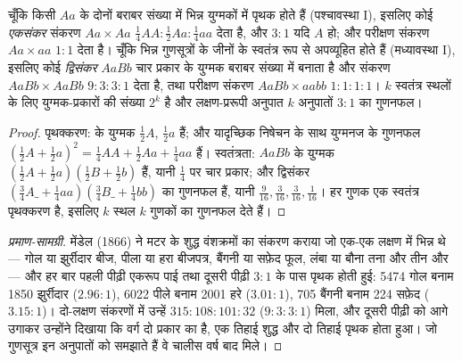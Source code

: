 \begin{theorem}[मेंडेल के अनुपात]\label{thm:b2:meiosis-heredity:mendel}
चूँकि किसी  $Aa$ के दोनों  बराबर संख्या में
भिन्न युग्मकों में पृथक होते हैं (पश्चावस्था I), इसलिए कोई
\emph{एकसंकर} संकरण $Aa \times Aa$  $\tfrac14 AA : \tfrac12 Aa :
\tfrac14 aa$ देता है, और  $3 : 1$ यदि $A$  हो; और
परीक्षण संकरण $Aa \times aa$ $1 : 1$ देता है। चूँकि भिन्न गुणसूत्रों के
जीनों के  स्वतंत्र रूप से अपव्यूहित होते हैं (मध्यावस्था I),
इसलिए कोई \emph{द्विसंकर} $AaBb$ चार प्रकार के युग्मक बराबर संख्या में
बनाता है और संकरण $AaBb \times AaBb$  $9 : 3 : 3 : 1$ देता
है, तथा परीक्षण संकरण $AaBb \times aabb$ $1 : 1 : 1 : 1$। $k$ स्वतंत्र
 स्थलों के लिए युग्मक-प्रकारों की संख्या $2^k$ है और
लक्षण-प्ररूपी अनुपात $k$ अनुपातों $3 : 1$ का गुणनफल।
\end{theorem}
\begin{proof}
पृथक्करण:  के युग्मक $\tfrac12 A$,
$\tfrac12 a$ हैं; और यादृच्छिक निषेचन के साथ युग्मनज के 
गुणनफल $(\tfrac12 A + \tfrac12 a)^2 = \tfrac14 AA + \tfrac12 Aa +
\tfrac14 aa$ हैं। स्वतंत्रता: $AaBb$ के युग्मक $(\tfrac12 A
+ \tfrac12 a)(\tfrac12 B + \tfrac12 b)$ हैं, यानी $\tfrac14$ पर चार
प्रकार; और द्विसंकर  $(\tfrac34 A\_ + \tfrac14 aa)
(\tfrac34 B\_ + \tfrac14 bb)$ का गुणनफल हैं, यानी $\tfrac{9}{16}, \tfrac{3}{16},
\tfrac{3}{16}, \tfrac{1}{16}$। हर गुणक एक स्वतंत्र पृथक्करण है,
इसलिए $k$ स्थल $k$ गुणकों का गुणनफल देते हैं।
\end{proof}
\begin{proof}[प्रमाण-सामग्री]
मेंडेल (1866) ने मटर के शुद्ध वंशक्रमों का संकरण कराया जो एक-एक लक्षण
में भिन्न थे --- गोल या झुर्रीदार बीज, पीला या हरा बीजपत्र, बैंगनी या
सफ़ेद फूल, लंबा या बौना तना और तीन और --- और हर बार पहली पीढ़ी एकरूप
पाई तथा दूसरी पीढ़ी $3 : 1$ के पास पृथक होती हुई: 5474 गोल बनाम 1850
झुर्रीदार ($2.96 :
1$), 6022 पीले बनाम 2001 हरे ($3.01 : 1$), 705 बैंगनी बनाम 224 सफ़ेद
($3.15 : 1$)। दो-लक्षण संकरणों में उन्हें $315 : 108 : 101 :
32$ ($9 : 3 : 3 : 1$) मिला, और दूसरी पीढ़ी को आगे उगाकर उन्होंने
दिखाया कि  वर्ग दो प्रकार का है, एक तिहाई शुद्ध और दो तिहाई
पृथक होता हुआ। जो गुणसूत्र इन अनुपातों को समझाते हैं वे चालीस वर्ष बाद
मिले।
\end{proof}


